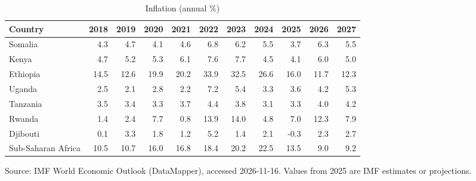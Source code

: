 \begin{table}[htbp]\centering
\caption{Inflation (annual \%)}
\begin{tabular}{lrrrrrrrrrr}
\toprule
Country & 2018 & 2019 & 2020 & 2021 & 2022 & 2023 & 2024 & 2025 & 2026 & 2027 \\
\midrule
Somalia & 4.3 & 4.7 & 4.1 & 4.6 & 6.8 & 6.2 & 5.5 & 3.7 & 6.3 & 5.5 \\
Kenya & 4.7 & 5.2 & 5.3 & 6.1 & 7.6 & 7.7 & 4.5 & 4.1 & 6.0 & 5.0 \\
Ethiopia & 14.5 & 12.6 & 19.9 & 20.2 & 33.9 & 32.5 & 26.6 & 16.0 & 11.7 & 12.3 \\
Uganda & 2.5 & 2.1 & 2.8 & 2.2 & 7.2 & 5.4 & 3.3 & 3.6 & 4.2 & 5.3 \\
Tanzania & 3.5 & 3.4 & 3.3 & 3.7 & 4.4 & 3.8 & 3.1 & 3.3 & 4.0 & 4.2 \\
Rwanda & 1.4 & 2.4 & 7.7 & 0.8 & 13.9 & 14.0 & 4.8 & 7.0 & 12.3 & 7.9 \\
Djibouti & 0.1 & 3.3 & 1.8 & 1.2 & 5.2 & 1.4 & 2.1 & -0.3 & 2.3 & 2.7 \\
Sub-Saharan Africa & 10.5 & 10.7 & 16.0 & 16.8 & 18.4 & 20.2 & 22.5 & 13.5 & 9.0 & 9.2 \\
\bottomrule
\end{tabular}
\par\smallskip\footnotesize Source: IMF World Economic Outlook (DataMapper), accessed 2026-11-16. Values from 2025 are IMF estimates or projections.
\end{table}
